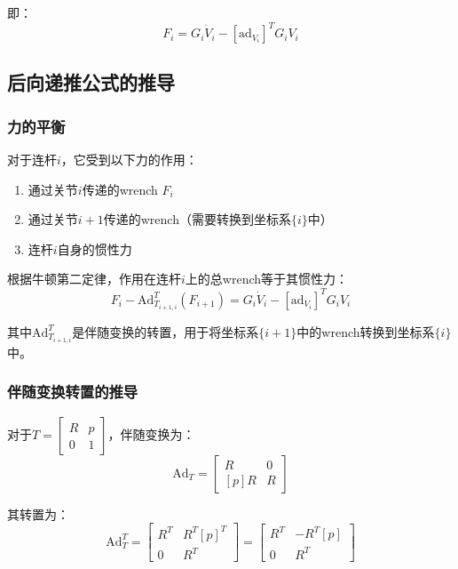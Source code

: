 \documentclass[12pt,a4paper]{article}
\begin{document}
即：
\begin{equation}
    F_i = G_i \dot{V}_i - [\text{ad}_{V_i}]^T G_i V_i
    \label{eq:rigid_body_dynamics_complete}
    \end{equation}
    
    \subsection{后向递推公式的推导}
    
    \subsubsection{力的平衡}
    
    对于连杆$i$，它受到以下力的作用：
    \begin{enumerate}
    \item 通过关节$i$传递的wrench $F_i$
    \item 通过关节$i+1$传递的wrench（需要转换到坐标系$\{i\}$中）
    \item 连杆$i$自身的惯性力
    \end{enumerate}
    
    根据牛顿第二定律，作用在连杆$i$上的总wrench等于其惯性力：
    \begin{equation}
    F_i - \text{Ad}_{T_{i+1,i}}^T(F_{i+1}) = G_i \dot{V}_i - [\text{ad}_{V_i}]^T G_i V_i
    \label{eq:force_balance}
    \end{equation}
    
    其中$\text{Ad}_{T_{i+1,i}}^T$是伴随变换的转置，用于将坐标系$\{i+1\}$中的wrench转换到坐标系$\{i\}$中。
    
    \subsubsection{伴随变换转置的推导}
    
    对于$T = \begin{bmatrix} R & p \\ 0 & 1 \end{bmatrix}$，伴随变换为：
    \begin{equation}
    \text{Ad}_T = \begin{bmatrix}
    R & 0 \\
    [p]R & R
    \end{bmatrix}
    \end{equation}
    
    其转置为：
    \begin{equation}
    \text{Ad}_T^T = \begin{bmatrix}
    R^T & R^T[p]^T \\
    0 & R^T
    \end{bmatrix} = \begin{bmatrix}
    R^T & -R^T[p] \\
    0 & R^T
    \end{bmatrix}
    \end{equation}
    
\end{document}
